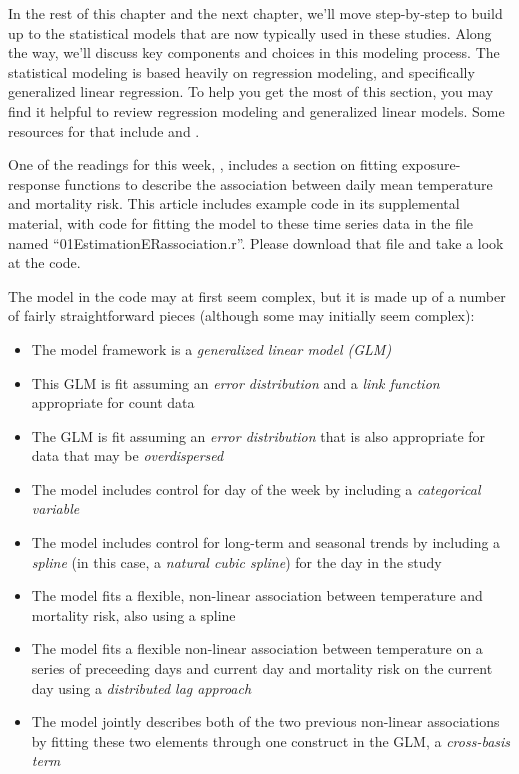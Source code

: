 \documentclass[
]{book}
\providecommand{\tightlist}{%
  \setlength{\itemsep}{0pt}\setlength{\parskip}{0pt}}
\begin{document}
In the rest of this chapter and the next chapter, we'll
move step-by-step to build up to the statistical models that are now typically
used in these studies.
Along the way, we'll discuss key components and choices in this modeling process.
The statistical modeling is based heavily on regression modeling, and specifically
generalized linear regression. To help you get the most of this section, you
may find it helpful to review regression modeling and generalized linear models.
Some resources for that include \citet{dunn2018generalized1} and \citet{james2013introduction3} .

One of the readings for this week, \citet{vicedo2019hands}, includes a section
on fitting exposure-response functions to describe the association between
daily mean temperature and mortality risk. This article includes example
code in its supplemental material, with code for fitting the model to
these time series data in the file named ``01EstimationERassociation.r''.
Please download that file and take a look at the code.

The model in the code may at first seem complex, but it is made up of a number of
fairly straightforward pieces (although some may initially seem complex):

\begin{itemize}
\tightlist
\item
  The model framework is a \emph{generalized linear model (GLM)}
\item
  This GLM is fit assuming an \emph{error distribution} and a \emph{link function}
  appropriate for count data
\item
  The GLM is fit assuming an \emph{error distribution} that is also appropriate for
  data that may be \emph{overdispersed}
\item
  The model includes control for day of the week by including a \emph{categorical
  variable}
\item
  The model includes control for long-term and seasonal trends by including
  a \emph{spline} (in this case, a \emph{natural cubic spline}) for the day in the study
\item
  The model fits a flexible, non-linear association between temperature
  and mortality risk, also using a spline
\item
  The model fits a flexible non-linear association between temperature on
  a series of preceeding days and current day and mortality risk on the
  current day using a \emph{distributed lag approach}
\item
  The model jointly describes both of the two previous non-linear associations
  by fitting these two elements through one construct in the GLM, a
  \emph{cross-basis term}
\end{itemize}
\end{document}
